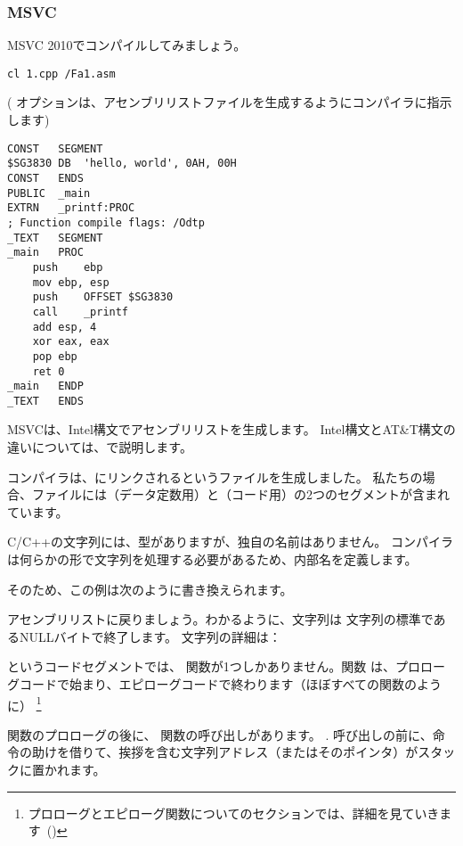 \subsubsection{MSVC}

MSVC 2010でコンパイルしてみましょう。

\begin{lstlisting}
cl 1.cpp /Fa1.asm
\end{lstlisting}

( オプションは、アセンブリリストファイルを生成するようにコンパイラに指示します)

\begin{lstlisting}[caption=MSVC 2010,style=customasmx86]
CONST	SEGMENT
$SG3830	DB	'hello, world', 0AH, 00H
CONST	ENDS
PUBLIC	_main
EXTRN	_printf:PROC
; Function compile flags: /Odtp
_TEXT	SEGMENT
_main	PROC
	push	ebp
	mov	ebp, esp
	push	OFFSET $SG3830
	call	_printf
	add	esp, 4
	xor	eax, eax
	pop	ebp
	ret	0
_main	ENDP
_TEXT	ENDS
\end{lstlisting}

MSVCは、Intel構文でアセンブリリストを生成します。 Intel構文とAT\&T構文の違いについては、で説明します。

コンパイラは、にリンクされるというファイルを生成しました。 
私たちの場合、ファイルには（データ定数用）と（コード用）の2つのセグメントが含まれています。

\label{string_is_const_char}
C/C++の文字列には、型がありますが、独自の名前はありません。
コンパイラは何らかの形で文字列を処理する必要があるため、内部名を定義します。

そのため、この例は次のように書き換えられます。



アセンブリリストに戻りましょう。わかるように、文字列は \CCpp 文字列の標準であるNULLバイトで終了します。 \CCpp 文字列の詳細は： 

というコードセグメントでは、\main{} 関数が1つしかありません。関数 \main は、プロローグコードで始まり、エピローグコードで終わります（ほぼすべての関数のように）
\footnote{プロローグとエピローグ関数についてのセクションでは、詳細を見ていきます~()}

関数のプロローグの後に、\printf{} 関数の呼び出しがあります。
.
呼び出しの前に、\PUSH 命令の助けを借りて、挨拶を含む文字列アドレス（またはそのポインタ）がスタックに置かれます。

